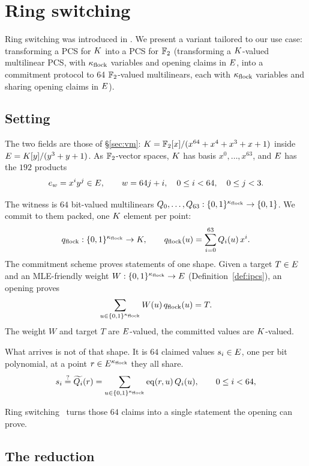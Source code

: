 \section{Ring switching}\label{annex:rs}

Ring switching was introduced in \cite{DP24}. We present a variant tailored to our use case: transforming a PCS for $K$ into a PCS for $\mathbb{F}_2$ (transforming a $K$-valued multilinear PCS, with $\kappa_{\mathrm{flock}}$ variables and opening claims in $E$, into a commitment protocol to 64 $\mathbb{F}_2$-valued multilinears, each with $\kappa_{\mathrm{flock}}$ variables and sharing opening claims in $E$).

\subsection{Setting}\label{rs:setting}

The two fields are those of \S\ref{sec:vm}: $K=\mathbb{F}_2[x]/(x^{64}+x^4+x^3+x+1)$ inside $E=K[y]/(y^3+y+1)$. As $\mathbb{F}_2$-vector spaces, $K$ has basis $x^0,\dots,x^{63}$, and $E$ has the $192$ products
\[
e_w=x^iy^j\in E,\qquad w=64j+i,\quad 0\le i<64,\quad 0\le j<3.
\]

The witness is $64$ bit-valued multilinears $Q_0,\dots,Q_{63}:\{0,1\}^{\kappa_{\mathrm{flock}}}\to\{0,1\}$. We commit to them packed, one $K$ element per point:
\[
q_{\mathrm{flock}}:\{0,1\}^{\kappa_{\mathrm{flock}}}\to K,\qquad q_{\mathrm{flock}}(u)=\sum_{i=0}^{63}Q_i(u)\,x^i.
\]
The commitment scheme proves statements of one shape. Given a target $T\in E$ and an MLE-friendly weight $W:\{0,1\}^{\kappa_{\mathrm{flock}}}\to E$ (Definition~\ref{def:ipcs}), an opening proves
\[
\sum_{u\in\{0,1\}^{\kappa_{\mathrm{flock}}}}W(u)\,q_{\mathrm{flock}}(u)=T.
\]
The weight $W$ and target $T$ are $E$-valued, the committed values are $K$-valued.

What arrives is not of that shape. It is $64$ claimed values $s_i\in E$, one per bit polynomial, at a point $r\in E^{\kappa_{\mathrm{flock}}}$ they all share.
\[
s_i \stackrel{?}{=} \widetilde{Q_i}(r)=\sum_{u\in\{0,1\}^{\kappa_{\mathrm{flock}}}}\operatorname{eq}(r,u)\,Q_i(u),\qquad 0\le i<64,
\]

Ring switching~\cite{DP24} turns those $64$ claims into a single statement the opening can prove.

\subsection{The reduction}\label{rs:reduction}

